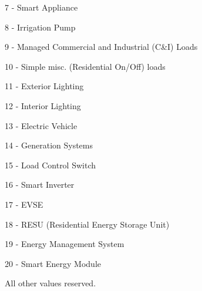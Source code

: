 7 -\/ Smart Appliance

8 -\/ Irrigation Pump

9 -\/ Managed Commercial and Industrial (C\&I) Loads

10 -\/ Simple misc. (Residential On/\+Off) loads

11 -\/ Exterior Lighting

12 -\/ Interior Lighting

13 -\/ Electric Vehicle

14 -\/ Generation Systems

15 -\/ Load Control Switch

16 -\/ Smart Inverter

17 -\/ E\+V\+SE

18 -\/ R\+E\+SU (Residential Energy Storage Unit)

19 -\/ Energy Management System

20 -\/ Smart Energy Module

All other values reserved. 